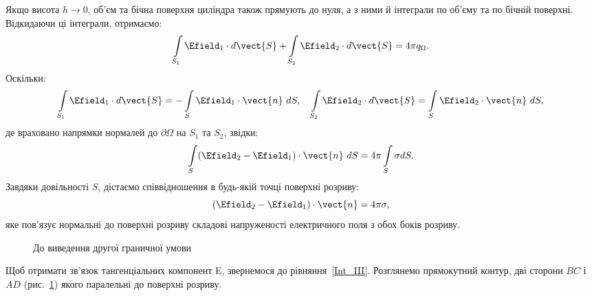Якщо висота $h  \to 0$, об'єм та бічна поверхня циліндра також прямують до нуля, а з ними й інтеграли по об'єму та по
бічній поверхні. Відкидаючи ці інтеграли, отримаємо:
\begin{equation*}
	\int\limits_{S_1} \Efield_1\cdot d\vect{S} +  \int\limits_{S_2} \Efield_2\cdot d\vect{S}  = 4\pi q_{\Omega}.
\end{equation*}
Оскільки:
\begin{equation*}
	\int\limits_{S_1} \Efield_1\cdot d\vect{S}  = - \int\limits_{S} \Efield_1\cdot \vect{n}\ dS, \quad
	\int\limits_{S_2} \Efield_2\cdot d\vect{S} = \int\limits_{S} \Efield_2\cdot \vect{n}\ dS,
\end{equation*}
де враховано напрямки нормалей до $\partial\Omega$ на $S_1$ та $S_2$, звідки:
\begin{equation*}
	\int\limits_{S} (\Efield_2 - \Efield_1)\cdot\vect{n}\ dS = 4\pi \int\limits_S \sigma dS.
\end{equation*}
Завдяки довільності $S$, дістаємо співвідношення в будь-якій точці поверхні розриву:
\begin{equation}\label{eq:bc1}
	(\Efield_2 - \Efield_1)\cdot\vect{n} = 4\pi\sigma,
\end{equation}
яке пов'язує нормальні до поверхні розриву складові напруженості електричного поля з обох боків розриву.

\begin{figure}
	\centering
	\caption{До виведення другої граничної умови}%
	\label{tikz:bc2}
\end{figure}

Щоб отримати зв'язок тангенціальних компонент E, звернемося до рівняння~\eqref{Int_III}. Розглянемо прямокутний контур,
дві сторони $BC$ і $AD$ (рис.~\ref{tikz:bc2}) якого паралельні до поверхні розриву.

